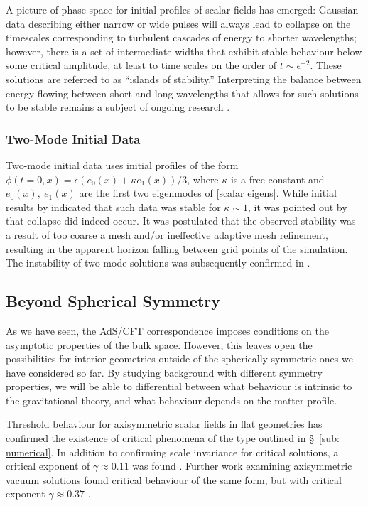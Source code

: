\documentclass[../PhD.tex]{subfiles}
\begin{document}
A picture of phase space for initial profiles of scalar fields has emerged: Gaussian data describing either narrow or wide pulses will always lead to collapse on the timescales corresponding to turbulent cascades of energy to shorter wavelengths; however, there is a set of intermediate widths that exhibit stable behaviour below some critical amplitude, at least to time scales on the order of $t \sim \epsilon^{-2}$. These solutions are referred to as ``islands of stability.'' Interpreting the balance between energy flowing between short and long wavelengths that allows for such solutions to be stable remains a subject of ongoing research \cite{1507.08261, Cownden, 1706.07413}.

\subsubsection{Two-Mode Initial Data}

Two-mode initial data uses initial profiles of the form $\phi(t=0,x) = \epsilon ( e_0 (x) + \kappa e_1 (x) )/3$, where $\kappa$ is a free constant and $e_0(x), \: e_1(x)$ are the first two eigenmodes of \eqref{scalar eigens}. While initial results by \cite{1403.6471} indicated that such data was stable for $\kappa \sim 1$, it was pointed out by \cite{1410.2631} that  collapse did indeed occur. It was postulated that the observed stability was a result of too coarse a mesh and/or ineffective adaptive mesh refinement, resulting in the apparent horizon falling between grid points of the simulation. The instability of two-mode solutions was subsequently confirmed in \cite{1508.02709}.


\subsection{Beyond Spherical Symmetry}
\label{sub: beyond spherical}

As we have seen, the AdS/CFT correspondence imposes conditions on the asymptotic properties of the bulk space. However, this leaves open the possibilities for interior geometries outside of the spherically-symmetric ones we have considered so far. By studying background with different symmetry properties, we will be able to differential between what behaviour is intrinsic to the gravitational theory, and what behaviour depends on the matter profile.

Threshold behaviour for axisymmetric scalar fields in flat geometries has confirmed the existence of critical phenomena of the type outlined in \S~\!\ref{sub: numerical}. In addition to confirming scale invariance for critical solutions, a critical exponent of $\gamma \approx 0.11$ was found \cite{gr-qc/0405101}. Further work examining axisymmetric vacuum solutions found critical behaviour of the same form, but with critical exponent $\gamma \approx 0.37$ \cite{Abrahams:1993wa}.
\end{document}
